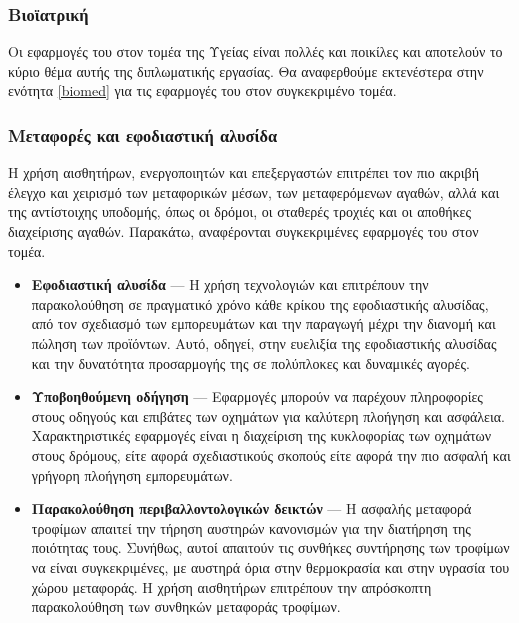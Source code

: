 \subsubsection{Βιοϊατρική}
Οι εφαρμογές του  στον τομέα της Υγείας είναι πολλές και ποικίλες και αποτελούν το κύριο θέμα αυτής της διπλωματικής εργασίας. Θα αναφερθούμε εκτενέστερα στην ενότητα \ref{biomed} για τις εφαρμογές του  στον συγκεκριμένο τομέα.
\subsubsection{Μεταφορές και εφοδιαστική αλυσίδα}
Η χρήση αισθητήρων, ενεργοποιητών και επεξεργαστών επιτρέπει τον πιο ακριβή έλεγχο και χειρισμό των μεταφορικών μέσων, των μεταφερόμενων αγαθών, αλλά και της αντίστοιχης υποδομής, όπως οι δρόμοι, οι σταθερές τροχιές και οι αποθήκες διαχείρισης αγαθών.
Παρακάτω, αναφέρονται συγκεκριμένες εφαρμογές του  στον τομέα.
\begin{itemize}
    \item \textbf{Εφοδιαστική αλυσίδα} --- Η χρήση τεχνολογιών  και  επιτρέπουν την παρακολούθηση σε πραγματικό χρόνο κάθε κρίκου της εφοδιαστικής αλυσίδας, από τον σχεδιασμό των εμπορευμάτων και την παραγωγή μέχρι την διανομή και πώληση των προϊόντων.
    Αυτό, οδηγεί, στην ευελιξία της εφοδιαστικής αλυσίδας και την δυνατότητα προσαρμογής της σε πολύπλοκες και δυναμικές αγορές.
    \item \textbf{Υποβοηθούμενη οδήγηση} --- Εφαρμογές  μπορούν να παρέχουν πληροφορίες στους οδηγούς και επιβάτες των οχημάτων για καλύτερη πλοήγηση και ασφάλεια. Χαρακτηριστικές εφαρμογές είναι η διαχείριση της κυκλοφορίας των οχημάτων στους δρόμους, είτε αφορά σχεδιαστικούς σκοπούς είτε αφορά την πιο ασφαλή και γρήγορη πλοήγηση εμπορευμάτων.
    \item \textbf{Παρακολούθηση περιβαλλοντολογικών δεικτών} --- Η ασφαλής μεταφορά τροφίμων απαιτεί την τήρηση αυστηρών κανονισμών για την διατήρηση της ποιότητας τους.
    Συνήθως, αυτοί απαιτούν τις συνθήκες συντήρησης των τροφίμων να είναι συγκεκριμένες, με αυστηρά όρια στην θερμοκρασία και στην υγρασία του χώρου μεταφοράς. Η χρήση αισθητήρων επιτρέπουν την απρόσκοπτη παρακολούθηση των συνθηκών μεταφοράς τροφίμων.
\end{itemize}

